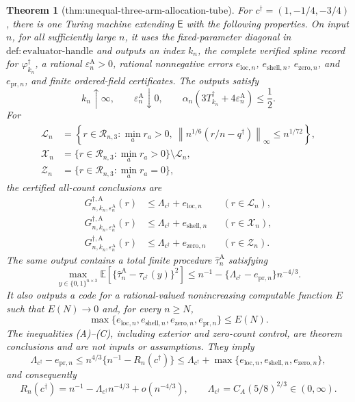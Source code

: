 \documentclass{article}
\newtheorem{theorem}{Theorem}
\begin{document}
\begin{theorem}[thm:unequal-three-arm-allocation-tube]\label{thm:unequal-three-arm-allocation-tube}
For \(c^\dagger=(1,-1/4,-3/4)\), there is one Turing machine extending \(\mathsf E\) with the following properties.  On input \(n\), for all sufficiently large \(n\), it uses the fixed-parameter diagonal in
\(\mathrm{def:evaluator\text{-}handle}\) and outputs an index \(k_n\), the complete verified spline record for \(\varphi_{k_n}^\dagger\), a rational
\(\varepsilon_n^{\mathrm A}>0\), rational nonnegative errors
\(e_{\mathrm{loc},n}\), \(e_{\mathrm{shell},n}\),
\(e_{\mathrm{zero},n}\), and \(e_{\mathrm{pr},n}\), and finite ordered-field certificates.  The outputs satisfy
\[
k_n\uparrow\infty,
\qquad \varepsilon_n^{\mathrm A}\downarrow0,
\qquad
\alpha_n(3T_{k_n}^\dagger+4\varepsilon_n^{\mathrm A})\le\frac12.
\]
For
\[
\begin{aligned}
\mathcal L_n&=\left\{r\in\mathcal R_{n,3}:\min_a r_a>0,
\ \left\|n^{1/6}(r/n-q^\dagger)\right\|_\infty
\le n^{1/72}\right\},\\
\mathcal X_n&=\{r\in\mathcal R_{n,3}:\min_a r_a>0\}
\setminus\mathcal L_n,\\
\mathcal Z_n&=\{r\in\mathcal R_{n,3}:\min_a r_a=0\},
\end{aligned}
\]
the certified all-count conclusions are
\[
\begin{aligned}
G_{n,k_n,\varepsilon_n^{\mathrm A}}^{\dagger,\mathrm A}(r)
&\le\Lambda_{c^\dagger}+e_{\mathrm{loc},n}
&& (r\in\mathcal L_n),\\
G_{n,k_n,\varepsilon_n^{\mathrm A}}^{\dagger,\mathrm A}(r)
&\le\Lambda_{c^\dagger}+e_{\mathrm{shell},n}
&& (r\in\mathcal X_n),\\
G_{n,k_n,\varepsilon_n^{\mathrm A}}^{\dagger,\mathrm A}(r)
&\le\Lambda_{c^\dagger}+e_{\mathrm{zero},n}
&& (r\in\mathcal Z_n).
\end{aligned}
\tag{A}
\]
The same output contains a total finite procedure \(\widehat\tau_n^{\mathrm A}\) satisfying
\[
\max_{y\in\{0,1\}^{n\times3}}
\mathbb E\left[\{\widehat\tau_n^{\mathrm A}-
\tau_{c^\dagger}(y)\}^2\right]
\le n^{-1}-\{\Lambda_{c^\dagger}-e_{\mathrm{pr},n}\}n^{-4/3}.
\tag{B}
\]
It also outputs a code for a rational-valued nonincreasing computable function
\(E\) such that \(E(N)\to0\) and, for every \(n\ge N\),
\[
\max\{e_{\mathrm{loc},n},e_{\mathrm{shell},n},
e_{\mathrm{zero},n},e_{\mathrm{pr},n}\}\le E(N).
\tag{C}
\]
The inequalities (A)--(C), including exterior and zero-count control, are theorem conclusions and are not inputs or assumptions.  They imply
\[
\Lambda_{c^\dagger}-e_{\mathrm{pr},n}
\le n^{4/3}\{n^{-1}-R_n(c^\dagger)\}
\le\Lambda_{c^\dagger}+
\max\{e_{\mathrm{loc},n},e_{\mathrm{shell},n},
e_{\mathrm{zero},n}\},
\]
and consequently
\[
R_n(c^\dagger)=n^{-1}-\Lambda_{c^\dagger}n^{-4/3}
+o(n^{-4/3}),
\qquad
\Lambda_{c^\dagger}=C_A(5/8)^{2/3}\in(0,\infty).
\]
\end{theorem}
\end{document}

